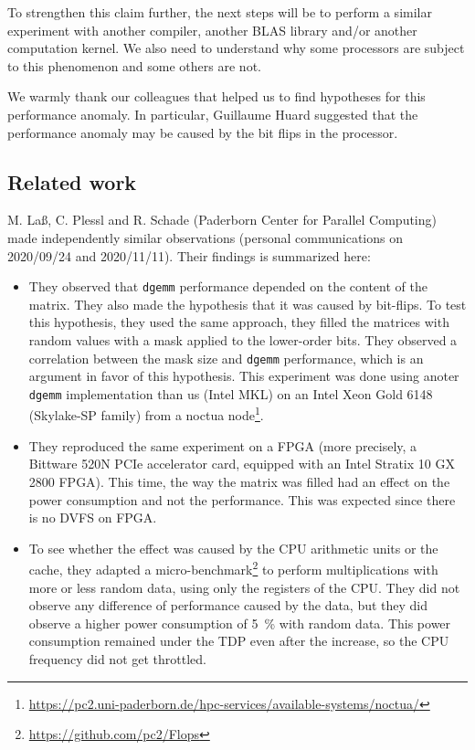             To strengthen this claim further, the next steps will be to perform a similar experiment with another
            compiler, another BLAS library and/or another computation kernel. We also need to understand why some
            processors are subject to this phenomenon and some others are not.

            We warmly thank our colleagues that helped us to find hypotheses for this performance anomaly. In
            particular, Guillaume Huard suggested that the performance anomaly may be caused by the bit flips in the
            processor.

        \subsection{Related work}%
            M. La{\ss}, C. Plessl and R. Schade (Paderborn Center for Parallel Computing) made independently similar
            observations (personal communications on 2020/09/24 and 2020/11/11). Their findings is summarized here:
            \begin{itemize}
                \item They observed that \texttt{dgemm} performance depended on the content of the matrix. They also
                    made the hypothesis that it was caused by bit-flips. To test this hypothesis, they used the same
                    approach, they filled the matrices with random values with a mask applied to the lower-order bits.
                    They observed a correlation between the mask size and \texttt{dgemm} performance, which is an
                    argument in favor of this hypothesis. This experiment was done using anoter \texttt{dgemm}
                    implementation than us (Intel MKL) on an Intel Xeon Gold 6148 (Skylake-SP family) from a noctua
                    node\footnote{\url{https://pc2.uni-paderborn.de/hpc-services/available-systems/noctua/}}.
                \item They reproduced the same experiment on a FPGA (more precisely, a Bittware 520N PCIe accelerator
                    card, equipped with an Intel Stratix 10 GX 2800 FPGA). This time, the way the matrix was filled had
                    an effect on the power consumption and not the performance. This was expected since there is no DVFS
                    on FPGA.
                \item To see whether the effect was caused by the CPU arithmetic units or the cache, they adapted a
                    micro-benchmark\footnote{\url{https://github.com/pc2/Flops}} to perform multiplications with more or
                    less random data, using only the registers of the CPU. They did not observe any difference of
                    performance caused by the data, but they did observe a higher power consumption of \SI{5}{\percent}
                    with random data. This power consumption remained under the TDP even after the increase, so the CPU
                    frequency did not get throttled.
            \end{itemize}

